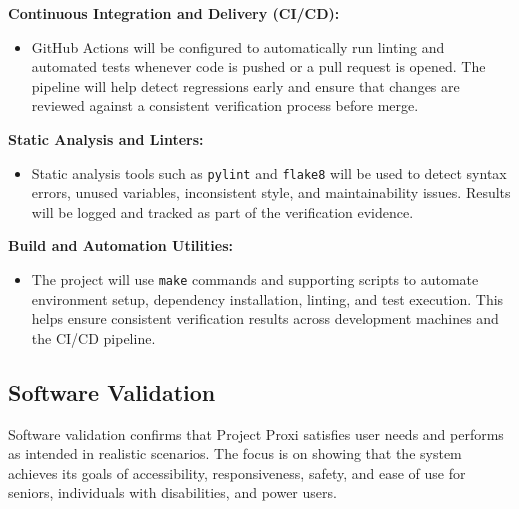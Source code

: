 \documentclass[12pt, titlepage]{article}
\begin{document}
\vspace{0.5em}
\noindent\textbf{Continuous Integration and Delivery (CI/CD):}
\begin{itemize}
\item GitHub Actions will be configured to automatically run linting and
  automated tests whenever code is pushed or a pull request is opened.
  The pipeline will help detect regressions early and ensure that changes
  are reviewed against a consistent verification process before merge.
\end{itemize}

\vspace{0.5em}
\noindent\textbf{Static Analysis and Linters:}
\begin{itemize}
\item Static analysis tools such as \texttt{pylint} and \texttt{flake8}
  will be used to detect syntax errors, unused variables, inconsistent
  style, and maintainability issues. Results will be logged and tracked
  as part of the verification evidence.
\end{itemize}

\vspace{0.5em}
\noindent\textbf{Build and Automation Utilities:}
\begin{itemize}
\item The project will use \texttt{make} commands and supporting scripts
  to automate environment setup, dependency installation, linting, and
  test execution. This helps ensure consistent verification results
  across development machines and the CI/CD pipeline.
\end{itemize}

\subsection{Software Validation}

Software validation confirms that Project Proxi satisfies user needs and
performs as intended in realistic scenarios. The focus is on showing that
the system achieves its goals of accessibility, responsiveness, safety,
and ease of use for seniors, individuals with disabilities, and power
users.
\end{document}
